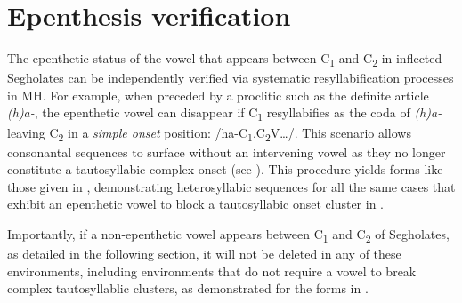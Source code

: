 \section{Epenthesis verification}\label{sec:epentheticver}

The epenthetic status of the vowel that appears between C\textsubscript{1} and C\textsubscript{2} in inflected Segholates can be independently verified via systematic resyllabification processes in MH. For example, when preceded by a proclitic such as the definite article \emph{(h)a-}, the epenthetic vowel can disappear if C\textsubscript{1} resyllabifies as the coda of \emph{(h)a-} leaving C\textsubscript{2} in a \emph{simple onset} position: /ha-C\textsubscript{1}.C\textsubscript{2}V\ldots{}/.
This scenario allows consonantal sequences to surface without an intervening vowel as they no longer constitute a tautosyllabic complex onset (see \cite[227]{bolozky2006notesk}). This procedure yields forms like those given in , demonstrating heterosyllabic sequences for all the same cases that exhibit an epenthetic vowel to block a tautosyllabic onset cluster in .

Importantly, if a non-epenthetic vowel appears between C\textsubscript{1} and C\textsubscript{2} of Segholates, as detailed in the following section, it will not be deleted in any of these environments, including environments that do not require a vowel to break complex tautosyllablic clusters, as demonstrated for the forms in .\largerpage[2]

